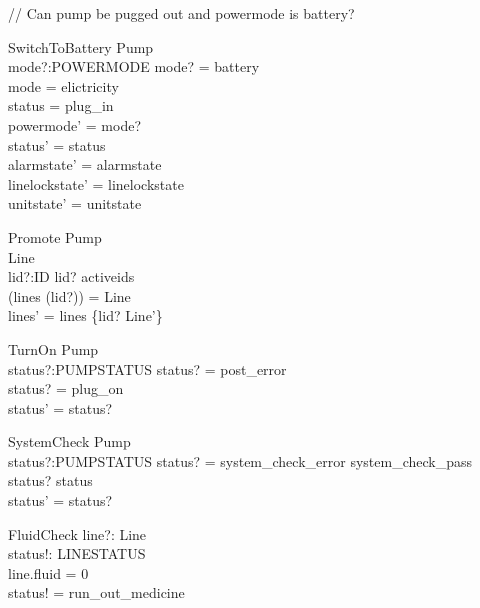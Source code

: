 \documentclass{article}
\begin{document}
	// Can pump be pugged out and powermode is battery?	
	
	\begin{schema}{SwitchToBattery}
		\Delta Pump\\
		mode?:POWERMODE
		\where 
		mode? = battery \\
		mode = elictricity \\
		status = plug\_in \\
		powermode' = mode? \\
		status' = status \\
		alarmstate' = alarmstate \\
		linelockstate' = linelockstate \\
		unitstate' = unitstate \\
	\end{schema}
	
	\begin{schema}{Promote}
		\Delta Pump\\
		\Delta Line\\
		lid?:ID
		\where 
		lid? \in activeids\\
		(lines (lid?)) = \theta Line\\
		lines' = lines \oplus \{lid? \mapsto \theta Line'\}
	\end{schema}
	
	\begin{schema}{TurnOn}
		\Delta Pump \\
		status?:PUMPSTATUS
		\where 
		status? = post\_error  \\
		status? = plug\_on \\
		status' = status?
	\end{schema}
			
	\begin{schema}{SystemCheck}
		\Delta Pump\\
		status?:PUMPSTATUS
		\where 
		status? = system\_check\_error \lor system\_check\_pass \\
		status? \neq status\\
		status' = status?
	\end{schema}
	
	\begin{schema}{FluidCheck}
 line?: Line\\
 status!: LINESTATUS\\
 \where 
 line.fluid = 0\\
 status! = run\_out\_medicine\\
 \end{schema}	
		
\end{document}
